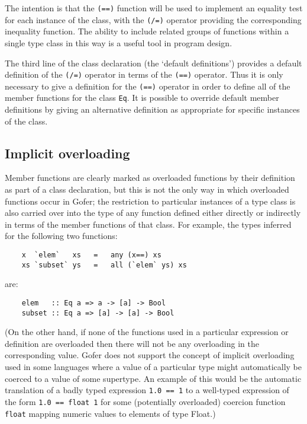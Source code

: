      The intention is that the \verb"(==)" function will be used to  implement
     an equality test for each instance of the  class,  with  the  \verb"(/=)"
     operator providing the  corresponding  inequality  function.   The
     ability to include related groups of  functions  within  a  single
     type class in this way is a useful tool in program design.

\IT  The  third  line  of   the   class   declaration   (the   `default
     definitions') provides a default definition of the  \verb"(/=)"  operator
     in terms of the \verb"(==)" operator.  Thus it is only necessary to  give
     a definition for the \verb"(==)" operator in order to define all  of  the
     member functions for the class \verb"Eq".  It  is  possible  to  override
     default member definitions by giving an alternative definition  as
     appropriate for specific instances of the class.
\EI
\subsection{Implicit overloading}
Member functions are clearly marked as overloaded  functions  by  their
definition as part of a class declaration, but this is not the only way
in which overloaded  functions  occur  in  Gofer;  the  restriction  to
particular instances of a type class is also carried over into the type
of any function defined either directly or indirectly in terms  of  the
member functions of that class.  For example, the  types  inferred  for
the following two functions:
\begin{verbatim}
    x  `elem`   xs   =   any (x==) xs
    xs `subset` ys   =   all (`elem` ys) xs
\end{verbatim}
are:
\begin{verbatim}
    elem   :: Eq a => a -> [a] -> Bool
    subset :: Eq a => [a] -> [a] -> Bool
\end{verbatim}
(On the  other  hand,  if  none  of  the  functions  used  in  a
particular expression or definition are overloaded then there will  not
be any overloading in the corresponding value.  Gofer does not  support
the concept of implicit overloading used  in  some  languages  where  a
value of a particular type might automatically be coerced to a value of
some supertype.  An example of this would be the automatic  translation
of a badly typed expression \verb"1.0 == 1" to a  well-typed  expression  of
the form \verb"1.0 == float 1" for some  (potentially  overloaded)  coercion
function \verb"float" mapping numeric values to elements of type Float.)

